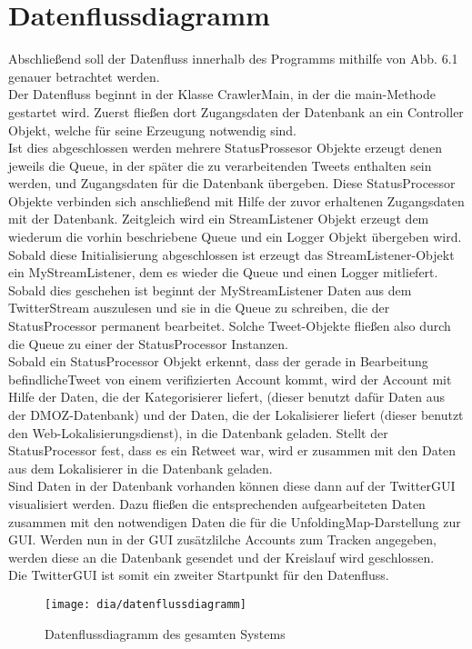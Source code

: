\section{Datenflussdiagramm}
Abschließend soll der Datenfluss innerhalb des Programms mithilfe von Abb. 6.1 genauer betrachtet werden.\\
Der Datenfluss beginnt in der Klasse CrawlerMain, in der die main-Methode gestartet wird. Zuerst fließen dort Zugangsdaten der Datenbank an ein Controller Objekt, welche für seine Erzeugung notwendig sind. \\
Ist dies abgeschlossen werden mehrere StatusProssesor Objekte erzeugt denen jeweils die Queue, in der später die zu verarbeitenden Tweets enthalten sein werden, und Zugangsdaten für die Datenbank übergeben. Diese StatusProcessor Objekte verbinden sich anschließend mit Hilfe der zuvor erhaltenen Zugangsdaten mit der Datenbank. Zeitgleich wird ein StreamListener Objekt erzeugt dem wiederum die vorhin beschriebene Queue und ein Logger Objekt übergeben wird. Sobald diese Initialisierung abgeschlossen ist erzeugt das StreamListener-Objekt ein MyStreamListener, dem es wieder die Queue und einen Logger mitliefert. Sobald dies geschehen ist beginnt der MyStreamListener Daten aus dem TwitterStream auszulesen und sie in die Queue zu schreiben, die der StatusProcessor permanent bearbeitet. Solche Tweet-Objekte fließen also durch die Queue zu einer der StatusProcessor Instanzen. \\
Sobald ein StatusProcessor Objekt erkennt, dass der gerade in Bearbeitung befindlicheTweet von einem verifizierten Account kommt, wird der Account mit Hilfe der Daten, die der Kategorisierer liefert, (dieser benutzt dafür Daten aus der DMOZ-Datenbank) und der Daten, die der Lokalisierer liefert (dieser benutzt den Web-Lokalisierungsdienst), in die Datenbank geladen. Stellt der StatusProcessor fest, dass es ein Retweet war, wird er zusammen mit den Daten aus dem Lokalisierer in die Datenbank geladen.\\
Sind Daten in der Datenbank vorhanden können diese dann auf der TwitterGUI visualisiert werden. Dazu fließen die entsprechenden aufgearbeiteten Daten zusammen mit den notwendigen Daten die für die UnfoldingMap-Darstellung zur GUI. Werden nun in der GUI zusätzlilche Accounts zum Tracken angegeben, werden diese an die Datenbank gesendet und der Kreislauf wird geschlossen.\\
Die TwitterGUI ist somit ein zweiter Startpunkt für den Datenfluss.	
\begin{figure}[h!]
	\centering
	\texttt{[image: dia/datenflussdiagramm]}
	\caption{Datenflussdiagramm des gesamten Systems}
	\label{fig:datenflussdiagramm}
\end{figure}	
